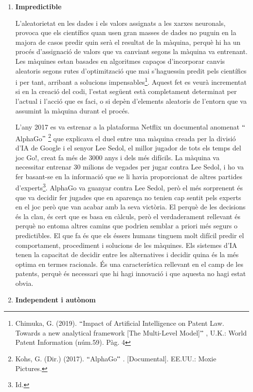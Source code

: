 \documentclass[12pt]{article}
\begin{document}
\begin{enumerate}
\vspace{\baselineskip}
	\item \textbf{Impredictible}\par


\vspace{\baselineskip}
L’aleatorietat en les dades i els valors assignats a les xarxes neuronals, provoca que els científics quan usen gran masses de dades no puguin en la majora de casos predir quin serà el resultat de la màquina, perquè hi ha un procés d’assignació de valors que va canviant segons la màquina va entrenant. Les màquines estan basades en algoritmes capaços d’incorporar canvis aleatoris segons rutes d’optimització que mai s’haguessin predit pels científics i per tant, arribant a solucions impensables\footnote{ Chimuka, G. (2019). $``$Impact of Artificial Intelligence on Patent Law. Towards a new analytical framework [The Multi-Level Model]$"$ , U.K.: World Patent Information (núm.59). Pàg. 4 }. Aquest fet es veurà incrementat si en la creació del codi, l’estat següent està completament determinat per l’actual i l’acció que es faci, o si depèn d’elements aleatoris de l’entorn que va assumint la màquina durant el procés. \par


\vspace{\baselineskip}
L’any 2017 es va estrenar a la plataforma Netflix un documental anomenat $``$AlphaGo$"$ \footnote{ Kohs, G. (Dir.) (2017). $``$AlphaGo$"$ . [Documental]. EE.UU.: Moxie Pictures.  } que explicava el duel entre una màquina creada per la divisió d’IA de Google i el senyor Lee Sedol, el millor jugador de tots els temps del joc Go!, creat fa més de 3000 anys i dels més difícils. La màquina va necessitar entrenar 30 milions de vegades per jugar contra Lee Sedol, i ho va fer basant-se en la informació que se li havia proporcionat de altres partides d’experts\footnote{ Id. }. AlphaGo va guanyar contra Lee Sedol, però el més sorprenent és que va decidir fer jugades que en aparença no tenien cap sentit pels experts en el joc però que van acabar amb la seva victòria. El perquè de les decisions és la clau, és cert que es basa en càlculs, però el verdaderament rellevant és perquè no entoma altres camins que podrien semblar a priori més segurs o predictibles. El que fa és que els éssers humans tinguem molt difícil predir el comportament, procediment i solucions de les màquines. Els sistemes d’IA tenen la capacitat de decidir entre les alternatives i decidir quina és la més optima en termes racionals. És una característica rellevant en el camp de les patents, perquè és necessari que hi hagi innovació i que aquesta no hagi estat obvia.\par


\vspace{\baselineskip}
	\item \textbf{Independent i autònom }
\end{enumerate}\par
\end{document}
